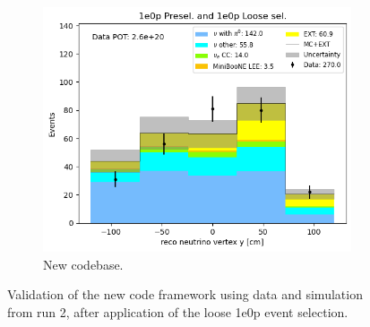 \begin{figure}[H]
\begin{subfigure}[t]{0.32\linewidth}
        \includegraphics[width=\linewidth]{technote/Appendix_Validation/Figures/1e0p_Loose/Run2_Vertex_Y_Alex.png}
        \caption{New codebase.}
    \end{subfigure}
    \caption{Validation of the new code framework using data and simulation from run 2, after application of the loose 1e0p event selection.}
\end{figure}

